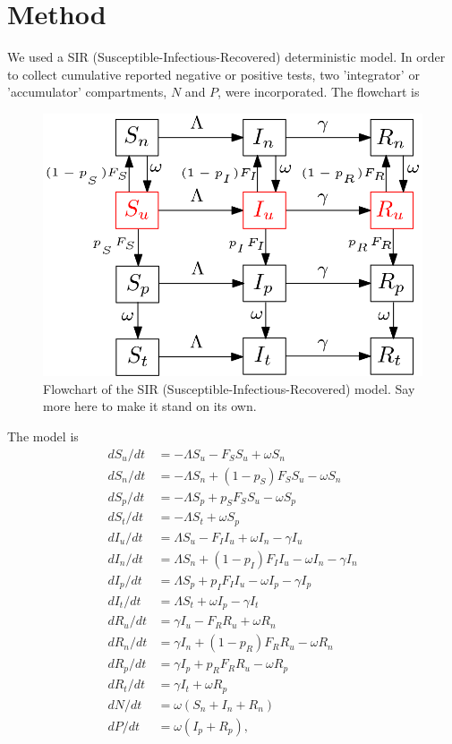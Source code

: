 \documentclass{article}
\theoremstyle{definition} %
\begin{document}
\section{Method}

We used a SIR (Susceptible-Infectious-Recovered) deterministic model. In order to collect cumulative reported negative or positive tests, two 'integrator' or 'accumulator' compartments, $N$ and $P$, were incorporated. The flowchart is 

\begin{figure}[!h] 
\begin{center} 
\includegraphics[scale=0.3]{./pix/sir_comp.png}
\caption{\small Flowchart of the SIR (Susceptible-Infectious-Recovered) model. Say more here to make it stand on its own.
\label{fig:flowchart}} 
\end{center} 
\end{figure}

The model is
\begin{align}
\label{model}
 d S_u/dt &= -\Lambda S_u - F_S S_u + \omega S_n \\
 d S_n/dt &= -\Lambda S_n + (1-p_S) F_S S_u - \omega S_n \\
 d S_p/dt &= -\Lambda S_p + p_S F_S S_u - \omega S_p \\
 d S_t/dt &= -\Lambda S_t + \omega S_p \\
 d I_u/dt &= \Lambda S_u - F_I I_u + \omega I_n  - \gamma I_u  \\
 d I_n/dt &= \Lambda S_n + (1-p_I) F_I I_u - \omega I_n -\gamma I_n \\
 d I_p/dt &= \Lambda S_p + p_I F_I I_u - \omega I_p -\gamma I_p \\
 d I_t/dt &= \Lambda S_t + \omega I_p - \gamma I_t  \\
 d R_u/dt &= \gamma I_u - F_R R_u + \omega R_n \\
 d R_n/dt &= \gamma I_n + (1-p_R) F_R R_u - \omega R_n  \\
 d R_p/dt &= \gamma I_p + p_R F_R R_u  - \omega R_p  \\
 d R_t/dt&= \gamma I_t + \omega R_p  \\
 dN/dt &= \omega (S_n + I_n + R_n)   \\
 dP/dt &= \omega(I_p + R_p),
\end{align}
\end{document}
